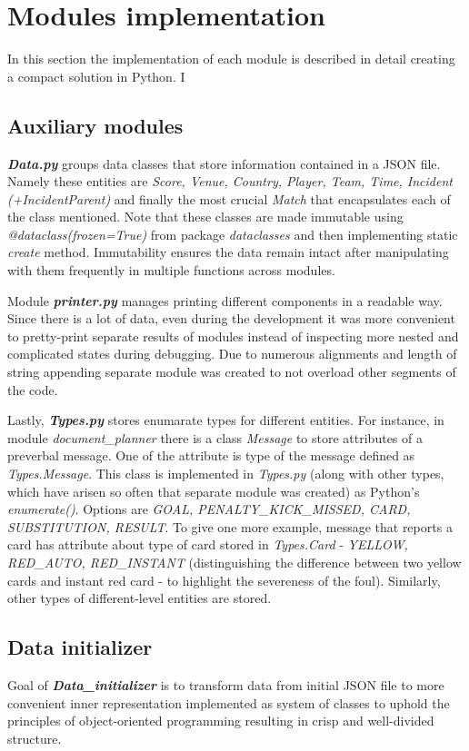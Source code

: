 \section{Modules implementation}
In this section the implementation of each module is described in detail creating a compact solution in Python. I

\subsection{Auxiliary modules}
\textbf{\textit{Data.py}} groups data classes that store information contained in a JSON file. Namely these entities are \emph{Score, Venue, Country, Player, Team, Time, Incident (+IncidentParent) } and finally the most crucial \emph{Match} that encapsulates each of the class mentioned. Note that these classes are made immutable using \emph{@dataclass(frozen=True)} from package \emph{dataclasses} and then implementing static \emph{create} method. Immutability ensures the data remain intact after manipulating with them frequently in multiple functions across modules. 

Module \textbf{\textit{printer.py}} manages printing different components in a readable way. Since there is a lot of data, even during the development it was more convenient to pretty-print separate results of modules instead of inspecting more nested and complicated states during debugging. Due to numerous alignments and length of string appending separate module was created to not overload other segments of the code.

Lastly, \textbf{\textit{Types.py}} stores enumarate types for different entities. For instance, in module \emph{document\_planner} there is a class \emph{Message} to store attributes of a preverbal message. One of the attribute is type of the message defined as \emph{Types.Message}. This class is implemented in \emph{Types.py} (along with other types, which have arisen so often that separate module was created) as Python's \emph{enumerate()}. Options are \emph{GOAL, PENALTY\_KICK\_MISSED, CARD, SUBSTITUTION, RESULT}. To give one more example, message that reports a card has attribute about type of card stored in \emph{Types.Card} - \emph{YELLOW, RED\_AUTO, RED\_INSTANT} (distinguishing the difference between two yellow cards and instant red card - to highlight the severeness of the foul). Similarly, other types of different-level entities are stored. 

\subsection{Data initializer}
Goal of \textbf{\textit{Data\_initializer}} is to transform data from initial JSON file to more convenient inner representation implemented as system of classes to uphold the principles of object-oriented programming resulting in crisp and well-divided structure.

